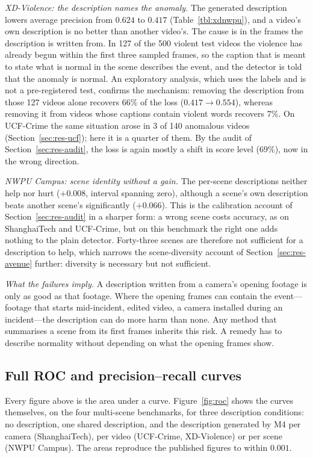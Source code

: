 \documentclass[a4paper,fleqn]{cas-sc}
\begin{document}
\emph{XD-Violence: the description names the anomaly.} The generated description
lowers average precision from $0.624$ to $0.417$ (Table~\ref{tbl:xdnwpu}), and a
video's own description is no better than another video's. The cause is in the frames
the description is written from. In 127 of the 500 violent test videos the violence
has already begun within the first three sampled frames, so the caption that is meant
to state what is normal in the scene describes the event, and the detector is told
that the anomaly is normal. An exploratory analysis, which uses the labels and is not
a pre-registered test, confirms the mechanism: removing the description from those
127 videos alone recovers $66\%$ of the loss ($0.417 \to 0.554$), whereas removing it
from videos whose captions contain violent words recovers $7\%$. On UCF-Crime the same
situation arose in 3 of 140 anomalous videos (Section~\ref{sec:res-ucf}); here it is a
quarter of them. By the audit of Section~\ref{sec:res-audit}, the loss is again mostly
a shift in score level ($69\%$), now in the wrong direction.

\emph{NWPU Campus: scene identity without a gain.} The per-scene descriptions neither
help nor hurt ($+0.008$, interval spanning zero), although a scene's own description
beats another scene's significantly ($+0.066$). This is the calibration account of
Section~\ref{sec:res-audit} in a sharper form: a wrong scene costs accuracy, as on
ShanghaiTech and UCF-Crime, but on this benchmark the right one adds nothing to the
plain detector. Forty-three scenes are therefore not sufficient for a description to
help, which narrows the scene-diversity account of Section~\ref{sec:res-avenue}
further: diversity is necessary but not sufficient.

\emph{What the failures imply.} A description written from a camera's opening
footage is only as good as that footage. Where the opening frames can contain the
event---footage that starts mid-incident, edited video, a camera installed during an
incident---the description can do more harm than none. Any method that summarises a
scene from its first frames inherits this risk. A remedy has to describe normality
without depending on what the opening frames show.

\subsection{Full ROC and precision--recall curves}
\label{sec:res-roc}
Every figure above is the area under a curve. Figure~\ref{fig:roc} shows the
curves themselves, on the four multi-scene benchmarks, for three description
conditions: no description, one shared description, and the description generated by M4 per
camera (ShanghaiTech), per video (UCF-Crime, XD-Violence) or per scene (NWPU
Campus). The areas reproduce the published figures to within $0.001$.
\end{document}
